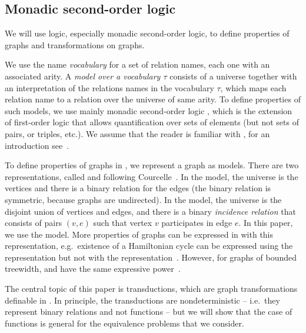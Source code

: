 
    \subsection{Monadic second-order logic}
    We will use logic, especially monadic second-order logic, to define properties of graphs and transformations on graphs. 

    We use the name  \emph{vocabulary} for a set of relation names, each one with an associated arity. A \emph{model over a vocabulary $\tau$} consists of a universe together with an interpretation of the relations names in the vocabulary $\tau$, which maps each relation name to a relation over the universe of same arity. To define properties of such models, we use mainly monadic second-order logic \mso, which  is the extension of first-order logic that allows quantification over sets of elements (but not sets of pairs, or triples, etc.). We assume that the reader is familiar with \mso, for an introduction see~\cite[Section 2]{Thomas97}.
     
     
      To define properties of graphs in \mso, we represent a graph as models. There are two representations, called  \msoone and \msotwo following 
 Courcelle~\cite[Definition 1.7]{courcelleVI}. In the \msoone model, the  universe is the vertices and there is a binary relation for the edges (the binary relation is symmetric, because graphs are undirected). In the \msotwo model, the universe is the disjoint union of vertices and edges, and there is a binary  \emph{incidence relation} that consists of pairs $(v,e)$ such that vertex $v$ participates in edge $e$. 
In this paper, we use the \msotwo model. More properties of graphs can be expressed in \mso with this representation, e.g.~existence of a Hamiltonian cycle can be expressed using the \msotwo representation but not with the \msoone representation~\cite[p.~118]{courcelleVI}. However, for graphs of bounded treewidth, \msoone and \msotwo have the same expressive power~\cite{}. 

  The central topic of this paper is \mso transductions, which are graph transformations definable in \mso. In principle, the transductions are nondeterministic -- i.e.~they represent binary relations and not functions -- but we will show that the case of functions is general for the equivalence problems that we consider.

